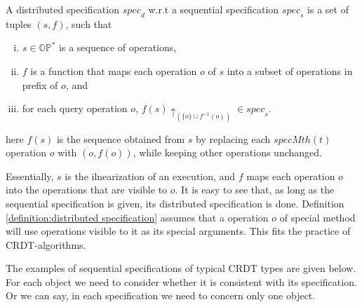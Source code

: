 {%

\begin{definition}
\label{definition:distributed specification}
A distributed specification $\mathit{spec}_d$ w.r.t a sequential specification $\mathit{spec}_s$ is a set of tuples $(s,f)$, such that

\begin{enumerate}[(i)]
\item $s \in \mathbb{OP}^*$ is a sequence of operations,
\item $f$ is a function that maps each operation $o$ of $s$ into a subset of operations in prefix of $o$, and
\item for each query operation $o$, $f(s) \uparrow_{ ( \{ o \} \cup f^{-1}(o))} \in \mathit{spec}_s$.
\end{enumerate}

here $f(s)$ is the sequence obtained from $s$ by replacing each $\mathit{specMth}(t)$ operation $o$ with $(o,f(o))$, while keeping other operations unchanged.
\end{definition}

Essentially, $s$ is the ilnearization of an execution, and $f$ maps each operation $o$ into the operations that are visible to $o$. It is easy to see that, as long as the sequential specification is given, its distributed specification is done. Definition \ref{definition:distributed specification} assumes that a operation $o$ of special method will use operations visible to it as its special arguments. This fits the practice of CRDT-algorithms.

The examples of sequential specifications of typical CRDT types are given below. For each object we need to consider whether it is consistent with its specification. Or we can say, in each specification we need to concern only one object.

}
